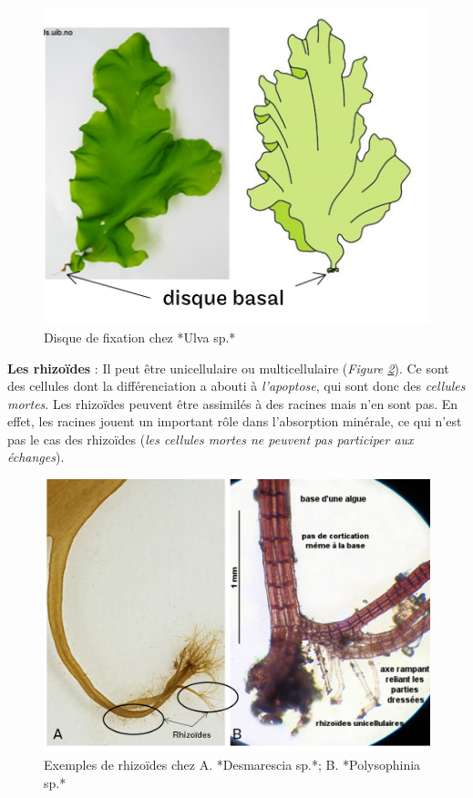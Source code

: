 \documentclass[
]{book}
\begin{document}
\begin{figure}[H]

{\centering \includegraphics[width=0.7\linewidth]{./images/Ulva_disques} 

}

\caption{Disque de fixation chez *Ulva sp.*}\label{fig:ulvadisque}
\end{figure}

\textbf{Les rhizoïdes} : Il peut être unicellulaire ou multicellulaire (\emph{Figure \ref{fig:rhizoide}}). Ce sont des cellules dont la différenciation a abouti à \emph{l'apoptose}, qui sont donc des \emph{cellules mortes}. Les rhizoïdes peuvent être assimilés à des racines mais n'en sont pas. En effet, les racines jouent un important rôle dans l'absorption minérale, ce qui n'est pas le cas des rhizoïdes (\emph{les cellules mortes ne peuvent pas participer aux échanges}).

\begin{figure}[H]

{\centering \includegraphics[width=0.7\linewidth]{./images/rhizoide} 

}

\caption{Exemples de rhizoïdes chez A. *Desmarescia sp.*; B. *Polysophinia sp.*}\label{fig:rhizoide}
\end{figure}
\end{document}
